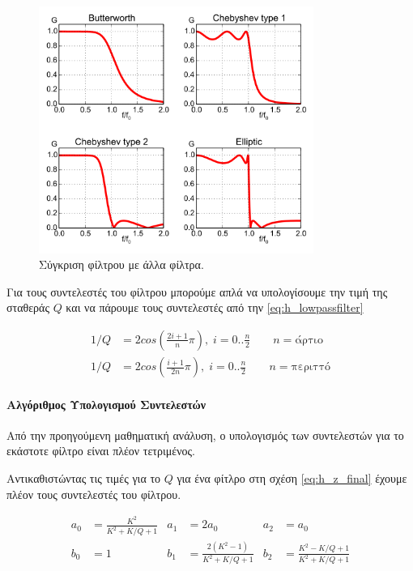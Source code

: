 \documentclass[12pt]{extarticle}
\begin{document}
\begin{figure}[htpb]
    \centering
    \includegraphics[width=0.8\textwidth]{./assets/comparison_filters.png}
    \caption{Σύγκριση φίλτρου  με άλλα φίλτρα.}
    \label{fig:}
\end{figure}

Για τους συντελεστές του φίλτρου  μπορούμε απλά να υπολογίσουμε την τιμή 
της σταθεράς $Q$ και να πάρουμε τους συντελεστές από την \cref{eq:h_lowpassfilter} \cite{OpenheimAlan, JuceDocumentation}

\begin{align}
    1/Q &= {2cos(\frac{2i + 1}{n}\pi)}, \; i = 0..\frac{n}{2} \qquad n = {\text{άρτιο}} \\ 
    1/Q &= {2cos(\frac{i + 1}{2n}\pi)}, \; i = 0..\frac{n}{2} \qquad n = {\text{περιττό}}
\end{align}

\paragraph{Αλγόριθμος Υπολογισμού Συντελεστών}

Από την προηγούμενη μαθηματική ανάλυση, ο υπολογισμός των συντελεστών για το εκάστοτε φίλτρο είναι πλέον 
τετριμένος. 

Αντικαθιστώντας τις τιμές για το $Q$ για ένα φίτλρο  στη σχέση \ref{eq:h_z_final}
έχουμε πλέον τους συντελεστές του φίλτρου. 


\begin{align}
    a_0 &= \frac{K^2}{K^2 + K/Q +1} & a_1 &= 2a_0 & a_2 &= a_0 \\
    b_0 &= 1 & b_1 &= \frac{2(K^2 - 1)}{K^2 + K/Q + 1} & b_2 &= \frac{K^2 - K/Q + 1}{K^2 + K/Q + 1}
\end{align}
\end{document}
